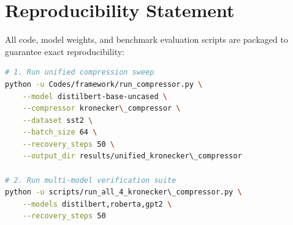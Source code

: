 \section{Reproducibility Statement}
All code, model weights, and benchmark evaluation scripts are packaged to guarantee exact reproducibility:
\begin{lstlisting}[language=bash]
# 1. Run unified compression sweep
python -u Codes/framework/run_compressor.py \
    --model distilbert-base-uncased \
    --compressor kronecker\_compressor \
    --dataset sst2 \
    --batch_size 64 \
    --recovery_steps 50 \
    --output_dir results/unified_kronecker\_compressor

# 2. Run multi-model verification suite
python -u scripts/run_all_4_kronecker\_compressor.py \
    --models distilbert,roberta,gpt2 \
    --recovery_steps 50
\end{lstlisting}
